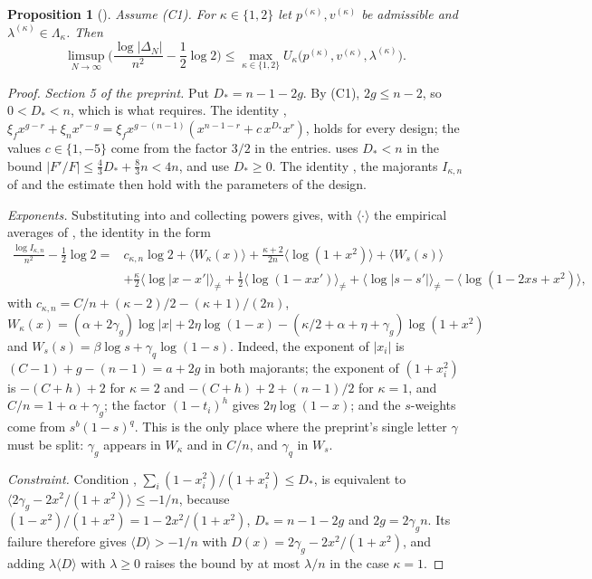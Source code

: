 \documentclass[11pt]{article}
\newtheorem{proposition}[theorem]{Proposition}
\theoremstyle{definition}
\begin{document}
\begin{proposition}[{\cite[Props.~5.2, 5.3, 6.1]{OAI}}]\label{prop:up}
Assume (C1). For $\kappa\in\{1,2\}$ let $p^{(\kappa)},v^{(\kappa)}$ be admissible and $\lambda^{(\kappa)}\in\Lambda_\kappa$. Then
\[
\limsup_{N\to\infty}\Big(\frac{\log|\Delta_N|}{n^2}-\frac12\log2\Big)\le\max_{\kappa\in\{1,2\}}U_\kappa\big(p^{(\kappa)},v^{(\kappa)},\lambda^{(\kappa)}\big).
\]
\end{proposition}

\begin{proof}
\emph{Section 5 of the preprint.} Put $D_*=n-1-2g$. By (C1), $2g\le n-2$, so $0<D_*<n$, which is what \cite[Eq.~(61)]{OAI} requires. The identity \cite[Eq.~(66)]{OAI}, $\xi_fx^{g-r}+\xi_nx^{r-g}=\xi_fx^{g-(n-1)}(x^{n-1-r}+c\,x^{D_*}x^r)$, holds for every design; the values $c\in\{1,-5\}$ come from the factor $3/2$ in the entries. \cite[Lemma~5.1]{OAI} uses $D_*<n$ in the bound $|F'/F|\le\frac43D_*+\frac83n<4n$, and \cite[Props.~5.2, 5.3]{OAI} use $D_*\ge0$. The identity \cite[Eq.~(65)]{OAI}, the majorants $I_{\kappa,n}$ of \cite[Eq.~(74)]{OAI} and the estimate \cite[Eq.~(75)]{OAI} then hold with the parameters of the design.

\emph{Exponents.} Substituting \cite[Eq.~(79)]{OAI} into \cite[Eq.~(74)]{OAI} and collecting powers gives, with $\langle\cdot\rangle$ the empirical averages of \cite[Sec.~6]{OAI}, the identity \cite[Eq.~(80)]{OAI} in the form
\begin{align*}
\frac{\log I_{\kappa,n}}{n^2}-\frac12\log2={}&c_{\kappa,n}\log2+\langle W_\kappa(x)\rangle+\frac{\kappa+2}{2n}\langle\log(1+x^2)\rangle+\langle W_s(s)\rangle\\
&+\frac\kappa2\langle\log|x-x'|\rangle_{\ne}+\frac12\langle\log(1-xx')\rangle_{\ne}+\langle\log|s-s'|\rangle_{\ne}-\langle\log(1-2xs+x^2)\rangle,
\end{align*}
with $c_{\kappa,n}=C/n+(\kappa-2)/2-(\kappa+1)/(2n)$, $W_\kappa(x)=(\alpha+2\gamma_g)\log|x|+2\eta\log(1-x)-(\kappa/2+\alpha+\eta+\gamma_g)\log(1+x^2)$ and $W_s(s)=\beta\log s+\gamma_q\log(1-s)$. Indeed, the exponent of $|x_i|$ is $(C-1)+g-(n-1)=a+2g$ in both majorants; the exponent of $(1+x_i^2)$ is $-(C+h)+2$ for $\kappa=2$ and $-(C+h)+2+(n-1)/2$ for $\kappa=1$, and $C/n=1+\alpha+\gamma_g$; the factor $(1-t_i)^h$ gives $2\eta\log(1-x)$; and the $s$-weights come from $s^b(1-s)^q$. This is the only place where the preprint's single letter $\gamma$ must be split: $\gamma_g$ appears in $W_\kappa$ and in $C/n$, and $\gamma_q$ in $W_s$.

\emph{Constraint.} Condition \cite[Eq.~(67)]{OAI}, $\sum_i(1-x_i^2)/(1+x_i^2)\le D_*$, is equivalent to $\langle2\gamma_g-2x^2/(1+x^2)\rangle\le-1/n$, because $(1-x^2)/(1+x^2)=1-2x^2/(1+x^2)$, $D_*=n-1-2g$ and $2g=2\gamma_gn$. Its failure therefore gives $\langle D\rangle>-1/n$ with $D(x)=2\gamma_g-2x^2/(1+x^2)$, and adding $\lambda\langle D\rangle$ with $\lambda\ge0$ raises the bound by at most $\lambda/n$ in the case $\kappa=1$.


\end{proof}
\end{document}
